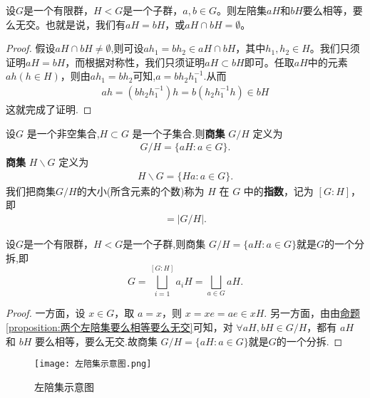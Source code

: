 \documentclass[../../main.tex]{subfiles}
\begin{document}
\begin{proposition}\label{proposition:两个左陪集要么相等要么无交}
设$G$是一个有限群，$H < G$是一个子群，$a,b \in G$。则左陪集$aH$和$bH$要么相等，要么无交。也就是说，我们有$aH = bH$，或$aH \cap bH = \emptyset$。
\end{proposition}
\begin{proof}
假设$aH\cap bH \neq \emptyset$,则可设$ah_1 = bh_2 \in aH\cap bH$，其中$h_1,h_2 \in H$。我们只须证明$aH = bH$，而根据对称性，我们只须证明$aH \subset bH$即可。任取$aH$中的元素$ah (h \in H)$，则由$ah_1 = bh_2$可知,$a=bh_2h_1^{-1}$.从而
\begin{align*}
ah=(bh_2h_1^{-1})h = b(h_2h_1^{-1}h) \in bH
\end{align*}
这就完成了证明.
\end{proof}

\begin{definition}[商集]\label{definition:商集和其指数}
设\(G\) 是一个非空集合,\(H \subset G\) 是一个子集合.则\textbf{商集} \(G/H\) 定义为
\begin{align*}
G/H = \{aH : a \in G\}.
\end{align*}
\textbf{商集} \(H\backslash G\) 定义为
\begin{align*}
H\backslash G = \{Ha : a \in G\}.
\end{align*}
我们把商集\(G/H\)的大小(所含元素的个数)称为 \(H\) 在 \(G\) 中的\textbf{指数}，记为 \([G : H]\)，即
\begin{align*}
[G : H] = |G/H|.
\end{align*} 
\end{definition}

\begin{theorem}\label{theorem:商集G/H构成G的一个分拆}
设$G$是一个有限群，$H < G$是一个子群,则商集 \(G/H= \{aH : a \in G\}\)就是$G$的一个分拆,即
\[
G=\bigsqcup_{i=1}^{\left[ G:H \right]}{a_iH}=\bigsqcup_{a\in G}{aH}.
\]
\end{theorem}
\begin{proof}
一方面，设 \(x \in G\)，取 \(a = x\)，则 \(x = xe = ae \in xH\).
另一方面，由由\hyperref[proposition:两个左陪集要么相等要么无交]{命题\ref{proposition:两个左陪集要么相等要么无交}}可知，对 \(\forall aH, bH \in G/H\)，都有 \(aH\) 和 \(bH\) 要么相等，要么无交.故商集 \(G/H= \{aH : a \in G\}\)就是$G$的一个分拆.
\end{proof}
\begin{note}
\begin{figure}[H]
\centering
\texttt{[image: 左陪集示意图.png]}
\label{figure:左陪集示意图}
\caption{左陪集示意图}
\end{figure}
\end{note}
\end{document}
